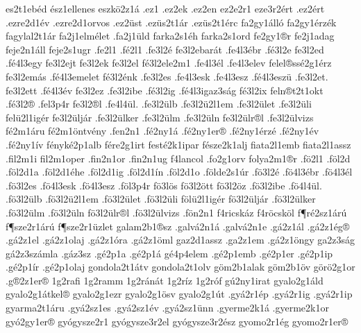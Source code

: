 {es2t1eb^^e9d
^^e9sz1ellenes
eszk^^f62z1^^e1
.ez1
.ez2ek
.ez2en
ez2e2r1
eze3r2^^e9rt
.ez2^^e9rt
.ezre2d1^^e9v
.ezre2d1orvos
.ez2^^fcst
.ez^^fcs2t1^^e1r
.ez^^fcs2t1^^e9rc
fa2gy1^^e1ll^^f3
fa2gy1^^e9rz^^e9k
fagylal2t1^^e1r
fa2j1elm^^e9let
.fa2j1^^fcld
farka2s1^^e9h
farka2s1ord
fe2gy1^^aer
fe2j1adag
feje2n1^^e1ll
feje2s1ugr
.fe2l1
.f^^e92l1
.fe3l2^^e9
fe3l2ebar^^e1t
.fe4l3^^e9br
.f^^e93l2e
fe3l2ed
.f^^e94l3egy %
fe3l2ejt
fe3l2ek %
fe3l2el
f^^e93l2ele2m1
.fe4l3^^e9l
.fe4l3elev
felel^^aess^^e92g1^^e9rz
fe3l2em^^e1s
.f^^e94l3emelet
f^^e93l2^^e9nk
.fe3l2es
.fe4l3esk
.fe4l3esz
.f^^e94l3esz^^fc
.fe3l2et.
fe3l2ett
.f^^e94l3^^e9v
fe3l2ez
.fe3l2ibe
.f^^e93l2ig
.f^^e94l3igaz3s^^e1g
f^^e93l2ix
feln^^aet2t1okt
.f^^e93l2^^ae
.fel3p4r
fe3l2^^ael
.fe4l4^^fcl.
.fe3l2^^fclb
.fe3l2^^fc2l1em
.fe3l2^^fclet
.fe3l2^^fcli
fel^^fc2l1ig^^e9r
fe3l2^^fclj^^e1r
.fe3l2^^fclker
.fe3l2^^fclm
.fe3l2^^fcln
fe3l2^^fclr^^ael
.fe3l2^^fclvizs
f^^e92m1^^e1ru
f^^e92m1^^f6ntv^^e9ny
.fen2n1
.f^^e92ny1^^e1
.f^^e92ny1er^^ae
.f^^e92ny1^^e9rz^^e9
.f^^e92ny1^^e9v
.f^^e92ny1^^edv
f^^e9nyk^^e92p1alb
f^^e9re2g1irt
fest^^e92k1ipar
f^^e9sze2k1alj
fiata2l1emb
fiata2l1assz
.fil2m1i
fil2m1oper
.fin2n1or
.fin2n1ug
f4lancol
.fo2g1orv
folya2m1^^aer
.f^^f62l1
.f^^f6l2d
.f^^f6l2d1a
.f^^f6l2d1^^e9he
.f^^f6l2d1ig
.f^^f6l2d1^^edn
.f^^f6l2d1o
.f^^f6lde2s1^^far
.f^^f63l2^^e9
.f^^f64l3^^e9br
.f^^f64l3^^e9l
.f^^f63l2es
.f^^f64l3esk
.f^^f64l3esz
.f^^f6l3p4r
f^^f63l^^f6s
f^^f63l2^^f6tt
f^^f63l2^^f6z
.f^^f63l2ibe
.f^^f64l4^^fcl.
.f^^f63l2^^fclb
.f^^f63l2^^fc2l1em
.f^^f63l2^^fclet
.f^^f63l2^^fcli
f^^f6l^^fc2l1ig^^e9r
f^^f63l2^^fclj^^e1r
.f^^f63l2^^fclker
.f^^f63l2^^fclm
.f^^f63l2^^fcln
f^^f63l2^^fclr^^ael
.f^^f63l2^^fclvizs
.f^^f6n2n1
f4ricsk^^e1z
f4r^^f6csk^^f6l
f^^b6r^^e92sz1^^e1r^^fa
f^^b6sze2r1^^e1r^^fa
f^^b6sze2r1^^fczlet
galam2b1^^aesz
.galv^^e12n1^^e1
.galv^^e12n1e
.g^^e12z1^^e1l
.g^^e12z1^^e9g^^ae
.g^^e12z1el
.g^^e12z1olaj
.g^^e12z1^^f3ra
.g^^e12z1^^f6ml
gaz2d1assz
.ga2z1em
.g^^e12z1^^f6ngy
ga2z3s^^e1g
g^^e12z3sz^^e1mla
.g^^e1z3sz
.g^^e92p1a
.g^^e92p1^^e1
g^^e94p4elem
.g^^e92p1emb
.g^^e92p1er
.g^^e92p1ip
.g^^e92p1^^edr
.g^^e92p1olaj
gondola2t1^^e1tv
gondola2t1olv
g^^f6m2b1alak
g^^f6m2b1^^f6v
g^^f6r^^f62g1or
.g^^ae2z1er^^ae
1g2rafi
1g2ramm
1g2r^^e1n^^e1t
1g2r^^edz
1g2r^^f3f
g^^fa2ny1irat
gyalo2g1^^e1ld
gyalo2g1^^e1tkel^^ae
gyalo2g1ezr
gyalo2g1^^f6sv
gyalo2g1^^fat
.gy^^e12r1^^e9p
.gy^^e12r1ig
.gy^^e12r1ip
gyarma2t1^^e1ru
.gy^^e12sz1es
.gy^^e12sz1^^e9v
.gy^^e12sz1^^fcnn
.gyerme2k1^^e1
.gyerme2k1or
gy^^f32gy1er^^ae
gy^^f3gysze2r1
gy^^f3gysze3r2el
gy^^f3gysze3r2^^e9sz
gyomo2r1^^e9g
gyomo2r1er^^ae
}
